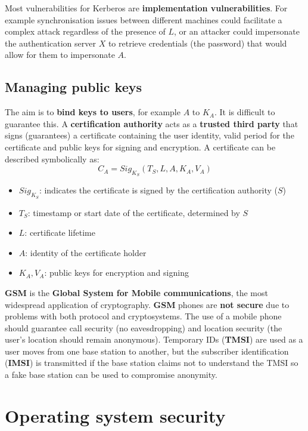 \documentclass{article}
\begin{document}
Most vulnerabilities for Kerberos are \textbf{implementation vulnerabilities}. For example synchronisation issues between different machines could facilitate a complex attack regardless of the presence of $ L $, or an attacker could impersonate the authentication server $ X $ to retrieve credentials (the password) that would allow for them to impersonate $ A $.

\subsection{Managing public keys}
The aim is to \textbf{bind keys to users}, for example $ A $ to $ K_{A} $. It is difficult to guarantee this. A \textbf{certification authority} acts as a \textbf{trusted third party} that signs (guarantees) a certificate containing the user identity, valid period for the certificate and public keys for signing and encryption. A certificate can be described symbolically as:
\[
	C_{A} = Sig_{K_{S}}(T_{S}, L, A, K_{A}, V_{A})
\]
\begin{itemize}
	\item $ Sig_{K_{S}} $: indicates the certificate is signed by the certification authority ($ S $)
	\item $ T_{S} $: timestamp or start date of the certificate, determined by $ S $
	\item $ L $: certificate lifetime
	\item $ A $: identity of the certificate holder
	\item $ K_{A}, V_{A} $: public keys for encryption and signing 
\end{itemize}
\textbf{GSM} is the \textbf{Global System for Mobile communications}, the most widespread application of cryptography. \textbf{GSM} phones are  \textbf{not secure} due to problems with both protocol and cryptosystems. The use of a mobile phone should guarantee call security (no eavesdropping) and location security (the user's location should remain anonymous). Temporary IDs (\textbf{TMSI}) are used as a user moves from one base station to another, but the subscriber identification (\textbf{IMSI}) is transmitted if the base station claims not to understand the TMSI so a fake base station can be used to compromise anonymity.

\section{Operating system security}
\end{document}
